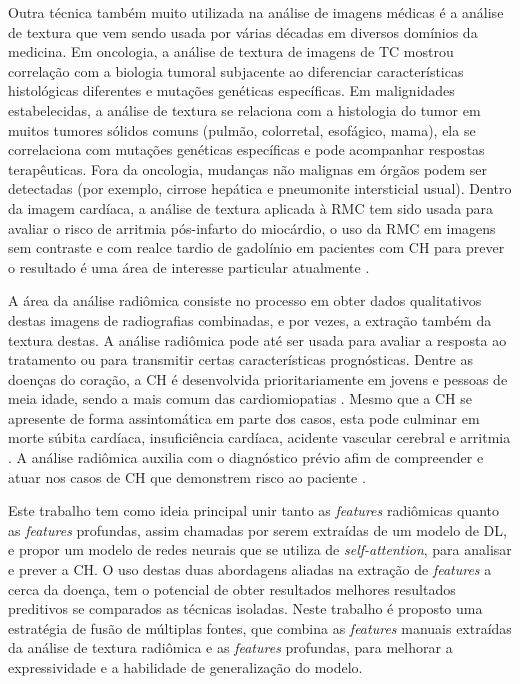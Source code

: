 Outra técnica também muito utilizada na análise de imagens médicas é a análise de textura que vem sendo usada por várias décadas em diversos domínios da medicina. Em oncologia, a análise de textura de imagens de \gls{TC} mostrou correlação com a biologia tumoral subjacente ao diferenciar características histológicas diferentes e mutações genéticas específicas. Em malignidades estabelecidas, a análise de textura se relaciona com a histologia do tumor em muitos tumores sólidos comuns (pulmão, colorretal, esofágico, mama), ela se correlaciona com mutações genéticas específicas e pode acompanhar respostas terapêuticas. Fora da oncologia, mudanças não malignas em órgãos podem ser detectadas (por exemplo, cirrose hepática e pneumonite intersticial usual). Dentro da imagem cardíaca, a análise de textura aplicada à \gls{RMC} tem sido usada para avaliar o risco de arritmia pós-infarto do miocárdio, o uso da RMC em imagens sem contraste e com realce tardio de gadolínio em pacientes com \gls{CH} para prever o resultado é uma área de interesse particular atualmente \cite{schofieldTextureAnalysisCardiovascular2019a}.

A área da análise radiômica consiste no processo em obter dados qualitativos destas imagens de radiografias combinadas, e por vezes, a extração também da textura destas. A análise radiômica pode até ser usada para avaliar a resposta ao tratamento ou para transmitir certas características prognósticas. Dentre as doenças do coração, a \gls{CH} é desenvolvida prioritariamente em jovens e pessoas de meia idade, sendo a mais comum das cardiomiopatias . Mesmo que a \gls{CH} se apresente de forma assintomática em parte dos casos, esta pode culminar em morte súbita cardíaca, insuficiência cardíaca, acidente vascular cerebral e arritmia . A análise radiômica auxilia com o diagnóstico prévio afim de compreender e atuar nos casos de \gls{CH} que demonstrem risco ao paciente \cite{kwonComparisonMortalityCause2022}.


Este trabalho tem como ideia principal unir tanto as \textit{features} radiômicas quanto as \textit{features} profundas, assim chamadas por serem extraídas de um modelo de \gls{DL}, e propor um modelo de redes neurais que se utiliza de \textit{self-attention}, para analisar e prever a \gls{CH}. O uso destas duas abordagens aliadas na extração de \textit{features} a cerca da doença, tem o potencial de obter resultados melhores resultados preditivos se comparados as técnicas isoladas. Neste trabalho é proposto uma estratégia de fusão de múltiplas fontes, que combina as \textit{features} manuais extraídas da análise de textura radiômica e as \textit{features} profundas, para melhorar a expressividade e a habilidade de generalização do modelo.

